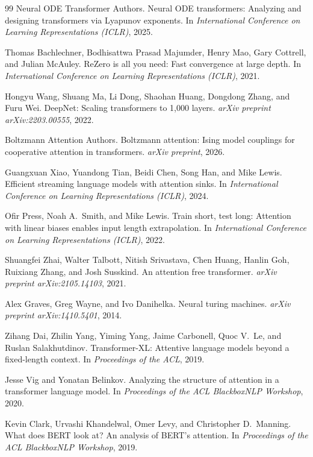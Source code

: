 \documentclass[10pt]{article}
\begin{document}
\begin{thebibliography}{99}
Neural ODE Transformer Authors.
\newblock Neural ODE transformers: Analyzing and designing transformers via Lyapunov exponents.
\newblock In \emph{International Conference on Learning Representations (ICLR)}, 2025.

Thomas Bachlechner, Bodhisattwa Prasad Majumder, Henry Mao, Gary Cottrell, and Julian McAuley.
\newblock ReZero is all you need: Fast convergence at large depth.
\newblock In \emph{International Conference on Learning Representations (ICLR)}, 2021.

Hongyu Wang, Shuang Ma, Li Dong, Shaohan Huang, Dongdong Zhang, and Furu Wei.
\newblock DeepNet: Scaling transformers to 1,000 layers.
\newblock \emph{arXiv preprint arXiv:2203.00555}, 2022.

Boltzmann Attention Authors.
\newblock Boltzmann attention: Ising model couplings for cooperative attention in transformers.
\newblock \emph{arXiv preprint}, 2026.

Guangxuan Xiao, Yuandong Tian, Beidi Chen, Song Han, and Mike Lewis.
\newblock Efficient streaming language models with attention sinks.
\newblock In \emph{International Conference on Learning Representations (ICLR)}, 2024.

Ofir Press, Noah A.~Smith, and Mike Lewis.
\newblock Train short, test long: Attention with linear biases enables input length extrapolation.
\newblock In \emph{International Conference on Learning Representations (ICLR)}, 2022.

Shuangfei Zhai, Walter Talbott, Nitish Srivastava, Chen Huang, Hanlin Goh, Ruixiang Zhang, and Josh Susskind.
\newblock An attention free transformer.
\newblock \emph{arXiv preprint arXiv:2105.14103}, 2021.

Alex Graves, Greg Wayne, and Ivo Danihelka.
\newblock Neural turing machines.
\newblock \emph{arXiv preprint arXiv:1410.5401}, 2014.

Zihang Dai, Zhilin Yang, Yiming Yang, Jaime Carbonell, Quoc V.~Le, and Ruslan Salakhutdinov.
\newblock Transformer-XL: Attentive language models beyond a fixed-length context.
\newblock In \emph{Proceedings of the ACL}, 2019.

Jesse Vig and Yonatan Belinkov.
\newblock Analyzing the structure of attention in a transformer language model.
\newblock In \emph{Proceedings of the ACL BlackboxNLP Workshop}, 2020.

Kevin Clark, Urvashi Khandelwal, Omer Levy, and Christopher D.~Manning.
\newblock What does BERT look at? An analysis of BERT's attention.
\newblock In \emph{Proceedings of the ACL BlackboxNLP Workshop}, 2019.

\end{thebibliography}
\end{document}
